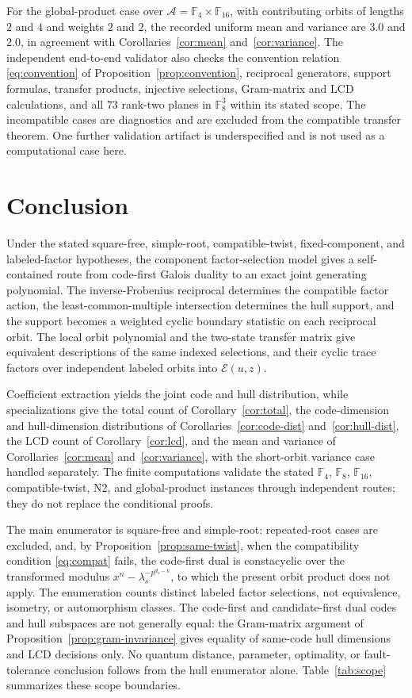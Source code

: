 \documentclass[11pt]{article}
\newcommand{\F}{\mathbb F}
\newcommand{\A}{\mathcal A}
\newcommand{\Epoly}{\mathscr E}
\theoremstyle{plain}
\theoremstyle{definition}
\theoremstyle{remark}
\begin{document}
For the global-product case over $\A=\F_4\times\F_{16}$, with contributing orbits of lengths $2$ and $4$ and weights $2$ and $2$, the recorded uniform mean and variance are $3.0$ and $2.0$, in agreement with Corollaries~\ref{cor:mean} and~\ref{cor:variance}. The independent end-to-end validator also checks the convention relation \eqref{eq:convention} of Proposition~\ref{prop:convention}, reciprocal generators, support formulas, transfer products, injective selections, Gram-matrix and LCD calculations, and all $73$ rank-two planes in $\F_8^3$ within its stated scope. The incompatible cases are diagnostics and are excluded from the compatible transfer theorem. One further validation artifact is underspecified and is not used as a computational case here.

\section{Conclusion}\label{sec:conclusion}

Under the stated square-free, simple-root, compatible-twist, fixed-component, and labeled-factor hypotheses, the component factor-selection model gives a self-contained route from code-first Galois duality to an exact joint generating polynomial. The inverse-Frobenius reciprocal determines the compatible factor action, the least-common-multiple intersection determines the hull support, and the support becomes a weighted cyclic boundary statistic on each reciprocal orbit. The local orbit polynomial and the two-state transfer matrix give equivalent descriptions of the same indexed selections, and their cyclic trace factors over independent labeled orbits into $\Epoly(u,z)$.

Coefficient extraction yields the joint code and hull distribution, while specializations give the total count of Corollary~\ref{cor:total}, the code-dimension and hull-dimension distributions of Corollaries~\ref{cor:code-dist} and~\ref{cor:hull-dist}, the LCD count of Corollary~\ref{cor:lcd}, and the mean and variance of Corollaries~\ref{cor:mean} and~\ref{cor:variance}, with the short-orbit variance case handled separately. The finite computations validate the stated $\F_4$, $\F_8$, $\F_{16}$, compatible-twist, N2, and global-product instances through independent routes; they do not replace the conditional proofs.

The main enumerator is square-free and simple-root: repeated-root cases are excluded, and, by Proposition~\ref{prop:same-twist}, when the compatibility condition \eqref{eq:compat} fails, the code-first dual is constacyclic over the transformed modulus $x^n-\lambda_s^{-p^{d_s-k}}$, to which the present orbit product does not apply. The enumeration counts distinct labeled factor selections, not equivalence, isometry, or automorphism classes. The code-first and candidate-first dual codes and hull subspaces are not generally equal: the Gram-matrix argument of Proposition~\ref{prop:gram-invariance} gives equality of same-code hull dimensions and LCD decisions only. No quantum distance, parameter, optimality, or fault-tolerance conclusion follows from the hull enumerator alone. Table~\ref{tab:scope} summarizes these scope boundaries.
\end{document}

